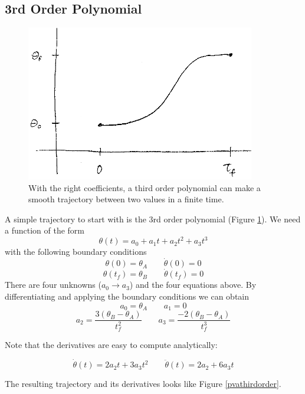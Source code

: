 \subsection{3rd Order Polynomial}\label{3rdPoly}

\begin{figure}[h]\centering
\includegraphics[width=10cm]{figs07/00510.eps}
\caption{With the right coefficients, a third order polynomial can make a smooth trajectory between two values in a finite time.}\label{thirdorderpolyfigure}
\end{figure}


A simple trajectory to start with is the 3rd order polynomial (Figure \ref{thirdorderpolyfigure}).  We need a function of the form
\[
\theta(t) = a_0 + a_1t + a_2t^2 + a_3t^3
\]
with the following boundary conditions
\[
\theta(0) = \theta_A		\qquad   \dot{\theta}(0) = 0
\]
\[
\theta(t_f) = \theta_B	\qquad   \dot{\theta}(t_f) = 0
\]
There are four unknowns ($a_0 \to a_3$) and the four equations above.
By differentiating and applying the boundary conditions we can obtain
\[
a_0 = \theta_A		\qquad a_1 = 0
\]
\[
 a_2 = \frac{3(\theta_B-\theta_A)}{t_f^2}	\qquad   a_3 = \frac{-2(\theta_B-\theta_A)}{t_f^3}
\]

Note that the derivatives are easy to compute analytically:

\[
\dot{\theta}(t) = 2a_2t + 3a_3t^2	\qquad \ddot{\theta}(t) = 2a_2 + 6a_3t
\]

The resulting trajectory and its derivatives looks like Figure \ref{pvathirdorder}.

